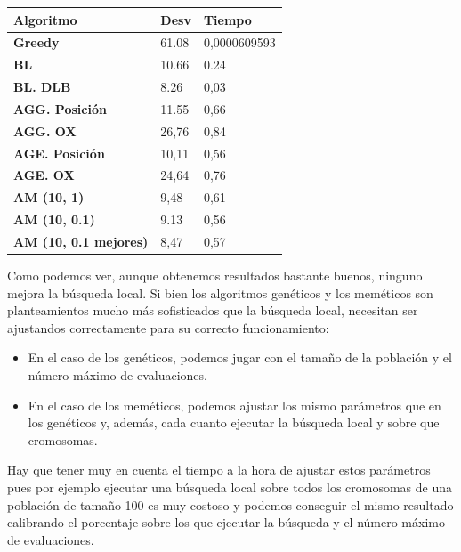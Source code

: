 \documentclass[a4paper, 12pt]{article}
\begin{document}
	\newpage
	\begin{table}[H]
\centering
\label{my-label}
\begin{tabular}{|l|l|l|}
\hline
\textbf{Algoritmo}            & \textbf{Desv} & \textbf{Tiempo} \\ \hline
\textbf{Greedy}               & 61.08         & 0,0000609593    \\ \hline
\textbf{BL}                   & 10.66         & 0.24            \\ \hline
\textbf{BL. DLB}              & 8.26          & 0,03            \\ \hline
\textbf{AGG. Posición}        & 11.55         & 0,66            \\ \hline
\textbf{AGG. OX}              & 26,76         & 0,84            \\ \hline
\textbf{AGE. Posición}        & 10,11         & 0,56            \\ \hline
\textbf{AGE. OX}              & 24,64         & 0,76            \\ \hline
\textbf{AM (10, 1)}           & 9,48          & 0,61            \\ \hline
\textbf{AM (10, 0.1)}         & 9.13          & 0,56            \\ \hline
\textbf{AM (10, 0.1 mejores)} & 8,47          & 0,57            \\ \hline
\end{tabular}
\end{table}

	Como podemos ver, aunque obtenemos resultados bastante buenos, ninguno mejora la búsqueda local. 
	Si bien los algoritmos genéticos y los meméticos son planteamientos mucho más sofisticados que la búsqueda local, necesitan ser ajustandos correctamente para su correcto funcionamiento:\\
	
	\begin{itemize}
		\item En el caso de los genéticos, podemos jugar con el tamaño de la población y el número máximo de evaluaciones.\\
	
		\item En el caso de los meméticos, podemos ajustar los mismo parámetros que en los genéticos y, además, cada cuanto ejecutar la búsqueda local y sobre que cromosomas.\\
	\end{itemize}
	
	Hay que tener muy en cuenta el tiempo a la hora de ajustar estos parámetros pues por ejemplo ejecutar una búsqueda local sobre todos los cromosomas de una población de tamaño 100 es muy costoso y podemos conseguir el mismo resultado calibrando el porcentaje sobre los que ejecutar la búsqueda y el número máximo de evaluaciones.\\
	
\end{document}
